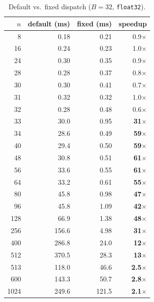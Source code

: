 \documentclass[10pt, letterpaper]{article}
\begin{document}
\begin{table}[h]
\centering
\caption{Default vs.\ fixed dispatch ($B = 32$, \texttt{float32}).}
\label{tab:f32_B32}
\begin{tabular}{r rrr}
\toprule
$n$ & default (ms) & fixed (ms) & speedup \\
\midrule
   8  & 0.18  & 0.21  & 0.9$\times$ \\
  16  & 0.24  & 0.23  & 1.0$\times$ \\
  24  & 0.30  & 0.35  & 0.9$\times$ \\
  28  & 0.28  & 0.37  & 0.8$\times$ \\
  30  & 0.30  & 0.41  & 0.7$\times$ \\
  31  & 0.32  & 0.32  & 1.0$\times$ \\
  32  & 0.28  & 0.48  & 0.6$\times$ \\
\midrule
  33  & 30.0  & 0.95  & \textbf{31$\times$} \\
  34  & 28.6  & 0.49  & \textbf{59$\times$} \\
  40  & 29.4  & 0.50  & \textbf{59$\times$} \\
  48  & 30.8  & 0.51  & \textbf{61$\times$} \\
  56  & 33.6  & 0.55  & \textbf{61$\times$} \\
  64  & 33.2  & 0.61  & \textbf{55$\times$} \\
  80  & 45.8  & 0.98  & \textbf{47$\times$} \\
  96  & 45.8  & 1.09  & \textbf{42$\times$} \\
 128  & 66.9  & 1.38  & \textbf{48$\times$} \\
 256  & 156.6 & 4.98  & \textbf{31$\times$} \\
 400  & 286.8 & 24.0  & \textbf{12$\times$} \\
 512  & 370.5 & 28.3  & \textbf{13$\times$} \\
 513  & 118.0 & 46.6  & \textbf{2.5$\times$} \\
 600  & 143.3 & 50.7  & \textbf{2.8$\times$} \\
1024  & 249.6 & 121.5 & \textbf{2.1$\times$} \\
\bottomrule
\end{tabular}
\end{table}
\end{document}
